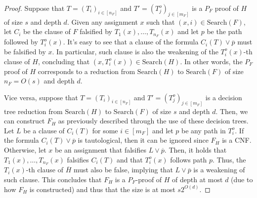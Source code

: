 \begin{proof}
    Suppose that $T = (T_i)_{i \in [n_F]}$ and $T' = (T_j^o)_{j \in [m_F]}$ is a $P_F$ proof of $H$ of size $s$ and depth $d$. Given any assignment $x$ such that $(x, i) \in \mathrm{Search}(F)$, let $C_i$ be the clause of $F$ falsified by $T_1(x), \ldots, T_{n_F}(x)$ and let $p$ be the path followed by $T_i^o(x)$. It's easy to see that a clause of the formula $C_i(T) \lor \overline{p}$ must be falsified by $x$. In particular, such clause is also the weakening of the $T_i^o(x)$-th clause of $H$, concluding that $(x, T_i^o(x)) \in \mathrm{Search}(H)$. In other words, the $P_F$ proof of $H$ corresponds to a reduction from $\mathrm{Search}(H)$ to $\mathrm{Search}(F)$ of size $n_F = O(s)$ and depth $d$.

    Vice versa, suppose that $T = (T_i)_{i \in [n_F]}$ and $T' = (T_j^o)_{j \in [m_F]}$ is a decision tree reduction from $\mathrm{Search}(H)$ to $\mathrm{Search}(F)$ of size $s$ and depth $d$. Then, we can construct $F_H$ as previously described through the use of these decision trees. Let $L$ be a clause of $C_i(T)$ for some $i \in [m_F]$ and let $p$ be any path in $T_i^o$. If the formula $C_i(T) \lor \overline{p}$ is tautological, then it can be ignored since $F_H$ is a CNF. Otherwise, let $x$ be an assignment that falsifies $L \lor \overline{p}$. Then, it holds that $T_1(x), \ldots, T_{n_F}(x)$ falsifies $C_i(T)$ and that $T_i^o(x)$ follows path $p$. Thus, the $T_i(x)$-th clause of $\overline{H}$ must also be false, implying that $L \lor \overline{p}$ is a weakening of such clause. This concludes that $F_H$ is a $P_F$-proof of $H$ of depth at most $d$ (due to how $F_H$ is constructed) and thus that the size is at most $s2^{O(d)}$.

\end{proof}

\cleardoublepage
